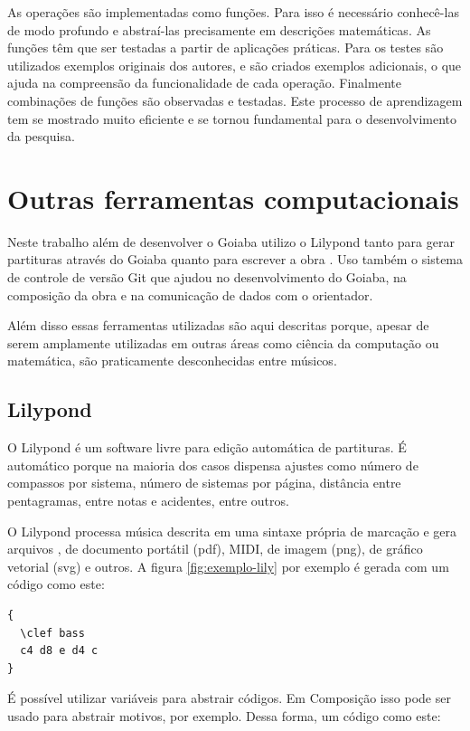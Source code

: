 As operações são implementadas como funções. Para isso é necessário
conhecê-las de modo profundo e abstraí-las precisamente em descrições
matemáticas. As funções têm que ser testadas a partir de aplicações
práticas. Para os testes são utilizados exemplos originais dos
autores, e são criados exemplos adicionais, o que ajuda na compreensão
da funcionalidade de cada operação. Finalmente combinações de funções
são observadas e testadas. Este processo de aprendizagem tem se
mostrado muito eficiente e se tornou fundamental para o
desenvolvimento da pesquisa.

\section{Outras ferramentas computacionais}
\label{sec:outr-ferr-comp}

Neste trabalho além de desenvolver o Goiaba utilizo o Lilypond tanto
para gerar partituras através do Goiaba quanto para escrever a obra
\obra{}. Uso também o sistema de controle de versão Git que ajudou no
desenvolvimento do Goiaba, na composição da obra e na comunicação de
dados com o orientador.

Além disso essas ferramentas utilizadas são aqui descritas porque,
apesar de serem amplamente utilizadas em outras áreas como ciência da
computação ou matemática, são praticamente desconhecidas entre
músicos.

\subsection{Lilypond}
\label{sec:lilypond}

O Lilypond \cite{nienhuys.ea08:lilypond} é um software livre para
edição automática de partituras. É automático porque na maioria dos
casos dispensa ajustes como número de compassos por sistema, número de
sistemas por página, distância entre pentagramas, entre notas e
acidentes, entre outros.

O Lilypond processa música descrita em uma sintaxe própria de marcação
e gera arquivos , de documento portátil (pdf), MIDI,
de imagem (png), de gráfico vetorial (svg) e outros. A figura
\ref{fig:exemplo-lily} por exemplo é gerada com um código como este:

\singlespacing
\begin{verbatim}
{
  \clef bass 
  c4 d8 e d4 c 
}
\end{verbatim}
\doublespacing

É possível utilizar variáveis para abstrair códigos. Em Composição
isso pode ser usado para abstrair motivos, por exemplo. Dessa forma,
um código como este:

